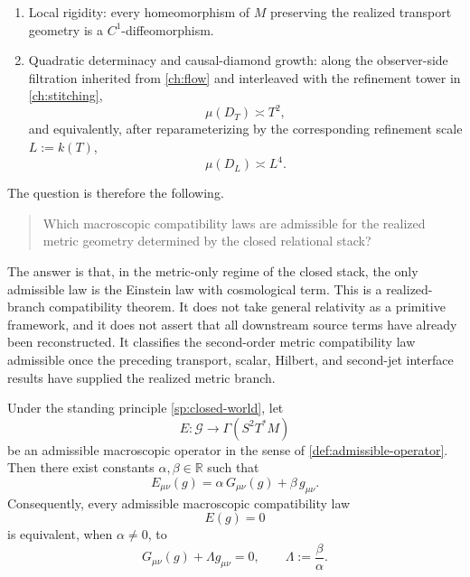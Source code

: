 \begin{enumerate}[label=\textup{(S\arabic*)}]
	      First-variation realization:
	      by Proposition~17.2.2, Theorem~17.9.1(ii), and Section~17.12,
	      the pointwise first-variation space \(V_p\) realizes as the
	      tangent space \(T_pM\), and, under the inherited second-jet faithfulness condition, the first-variation pairing on the
	      realized degree--\(2\) channel attached to the stabilized
	      quadratic carrier
	      \[
		      B_p:V_p\times V_p\to\mathbb R
	      \]
	      is identified with the Lorentz metric pairing
	      \[
		      g_p:T_pM\times T_pM\to\mathbb R.
	      \]
	\item \label{ein:S9}
	      Local rigidity:
	      every homeomorphism of \(M\) preserving the realized transport geometry
	      is a \(C^1\)-diffeomorphism.
	\item \label{ein:S10}
	      Quadratic determinacy and causal-diamond growth:
	      along the observer-side filtration inherited from
	      \cref{ch:flow} and interleaved with the refinement tower in
	      \cref{ch:stitching},
	      \[
		      \mu(D_T)\asymp T^2,
	      \]
	      and equivalently, after reparameterizing by the corresponding
	      refinement scale \(L:=k(T)\),
	      \[
		      \mu(D_L)\asymp L^4.
	      \]
\end{enumerate}
The question is therefore the following.
\begin{quote}
	Which macroscopic compatibility laws are admissible for the realized
	metric geometry determined by the closed relational stack?
\end{quote}
The answer is that, in the metric-only regime of the closed stack, the
only admissible law is the Einstein law with cosmological term.
This is a realized-branch compatibility theorem.  It does not take
general relativity as a primitive framework, and it does not assert that
all downstream source terms have already been reconstructed.  It
classifies the second-order metric compatibility law admissible once the
preceding transport, scalar, Hilbert, and second-jet interface results
have supplied the realized metric branch.
\begin{theorem}
	\label{thm:einstein-main}
	Under the standing principle \cref{sp:closed-world}, let
	\[
		E:\mathcal G\to \Gamma(S^2T^*M)
	\]
	be an admissible macroscopic operator in the sense of
	\cref{def:admissible-operator}.
	Then there exist constants \(\alpha,\beta\in\mathbb R\) such that
	\[
		E_{\mu\nu}(g)=\alpha\,G_{\mu\nu}(g)+\beta\,g_{\mu\nu}.
	\]
	Consequently, every admissible macroscopic compatibility law
	\[
		E(g)=0
	\]
	is equivalent, when \(\alpha\neq 0\), to
	\[
		G_{\mu\nu}(g)+\Lambda g_{\mu\nu}=0,
		\qquad
		\Lambda:=\frac{\beta}{\alpha}.
	\]
\end{theorem}
